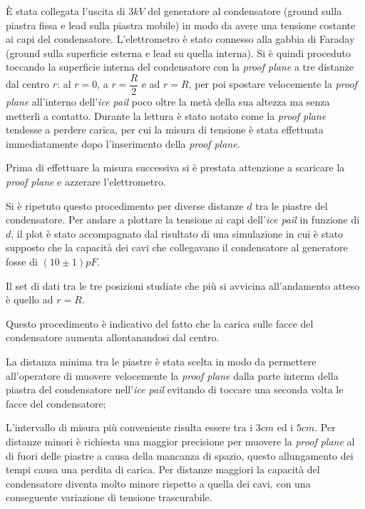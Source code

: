 {\fontsize{12}{14}\selectfont 

È stata collegata l'uscita di $3kV$ del generatore al condensatore (ground sulla piastra fissa e lead sulla piastra mobile) in modo da avere una tensione costante ai capi del condensatore. L'elettrometro è stato connesso alla gabbia di Faraday (ground sulla superficie esterna e lead su quella interna). Si è quindi proceduto toccando la superficie interna del condensatore con la \emph{proof plane} a tre distanze dal centro $r$: al $r = 0$, a $r = \dfrac{R}{2}$ e ad $r = R$, per poi spostare velocemente la \emph{proof plane} all'interno dell'\emph{ice pail} poco oltre la metà della sua altezza ma senza metterli a contatto. Durante la lettura è stato notato come la \emph{proof plane} tendesse a perdere carica, per cui la misura di tensione è stata effettuata immediatamente dopo l'inserimento della \emph{proof plane}.
\par
Prima di effettuare la misura successiva si è prestata attenzione a scaricare la \emph{proof plane} e azzerare l'elettrometro.

\par
Si è ripetuto questo procedimento per diverse distanze $d$ tra le piastre del condensatore. Per andare a plottare la tensione ai capi dell'\emph{ice pail} in funzione di $d$, il plot è stato accompagnato dal risultato di una simulazione in cui è stato supposto che la capacità dei cavi che collegavano il condensatore al generatore fosse di $(10 \pm 1)pF$.
\par
Il set di dati tra le tre posizioni studiate che più si avvicina all'andamento atteso è quello ad $r = R$.
\par
Questo procedimento è indicativo del fatto che la carica sulle facce del condensatore aumenta allontanandosi dal centro.
\par
La distanza minima tra le piastre è stata scelta in modo da permettere all'operatore di muovere velocemente la \emph{proof plane} dalla parte interna della piastra del condensatore nell'\emph{ice pail} evitando di toccare una seconda volta le facce del condensatore; 
\par
L'intervallo di misura più conveniente risulta essere tra i $3cm$ ed i $5cm$. Per distanze minori è richiesta una maggior precisione per muovere la \emph{proof plane} al di fuori delle piastre a causa della mancanza di spazio, questo allungamento dei tempi causa una perdita di carica. Per distanze maggiori la capacità del condensatore diventa molto minore rispetto a quella dei cavi, con una conseguente variazione di tensione trascurabile.
\par}